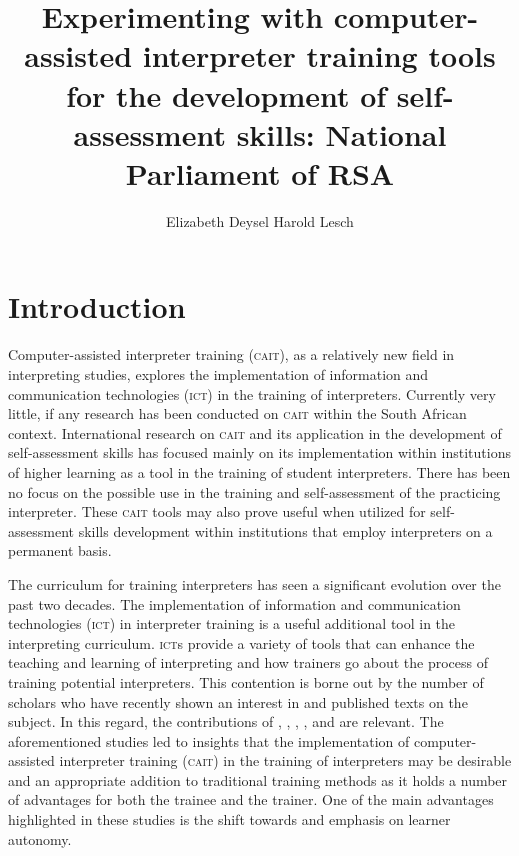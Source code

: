 \documentclass[output=paper]{langsci/langscibook}
\author{Elizabeth Deysel\affiliation{National Parliament of South Africa}\lastand%
 Harold Lesch\affiliation{Stellenbosch University}
}
\title{Experimenting with computer-assisted interpreter training tools for the development of self-assessment skills: National Parliament of RSA}
\begin{document}
\section{Introduction} 
Computer-assisted interpreter training (\textsc{cait}), as a relatively new field in interpreting studies, explores the implementation of information and communication technologies (\textsc{ict}) in the training of interpreters. Currently very little, if any research has been conducted on \textsc{cait} within the South African context. International research on \textsc{cait} and its application in the development of self-assessment skills has focused mainly on its implementation within institutions of higher learning as a tool in the training of student interpreters. There has been no focus on the possible use in the training and self-assessment of the practicing interpreter. These \textsc{cait} tools may also prove useful when utilized for self-assessment skills development within institutions that employ interpreters on a permanent basis.  

The curriculum for training interpreters has seen a significant evolution over the past two decades. The implementation of information and communication technologies (\textsc{ict}) in interpreter training is a useful additional tool in the interpreting curriculum. \textsc{ict}s provide a variety of tools that can enhance the teaching and learning of interpreting and how trainers go about the process of training potential interpreters. This contention is borne out by the number of scholars who have recently shown an interest in and published texts on the subject. In this regard, the contributions of \citet{Lim2014}, \citet{Pinazo2008}, \citet{Gorm2007}, \citet{Sandrelli2007b}, \citet{Lee2005} and \citet{Sandrelli2015, Sandrelli2007b, Sandrelli2002} are relevant. The aforementioned studies led to insights that the implementation of computer-assisted interpreter training (\textsc{cait}) in the training of interpreters may be desirable and an appropriate addition to traditional training methods as it holds a number of advantages for both the trainee and the trainer. One of the main advantages highlighted in these studies is the shift towards and emphasis on learner autonomy. 
\end{document}
